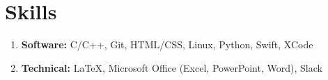 \section{Skills}
\vspace{-1mm}
\begin{enumerate}[leftmargin = 0pt, topsep = 0pt, itemsep = 0.000pt, noitemsep]



\item[]\textbf{Software:} C/C++, Git, HTML/CSS, Linux, Python, Swift, XCode 
\item[]\textbf{Technical:} \LaTeX, Microsoft Office (Excel, PowerPoint, Word), Slack

\end{enumerate}
